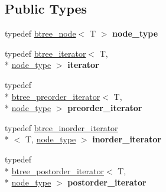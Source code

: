 \subsection*{Public Types}
\begin{DoxyCompactItemize}
\item 
\hypertarget{classtree_1_1cBinaryRep_a4218118406b4b792f771f2cffab1fe67}{typedef \hyperlink{structtree_1_1btree__node}{btree\-\_\-node}$<$ T $>$ {\bfseries node\-\_\-type}}\label{classtree_1_1cBinaryRep_a4218118406b4b792f771f2cffab1fe67}

\item 
\hypertarget{classtree_1_1cBinaryRep_af8646ca9dd6c8e2abc30f0a24eea2785}{typedef \hyperlink{classtree_1_1btree__iterator}{btree\-\_\-iterator}$<$ T, \\*
\hyperlink{structtree_1_1btree__node}{node\-\_\-type} $>$ {\bfseries iterator}}\label{classtree_1_1cBinaryRep_af8646ca9dd6c8e2abc30f0a24eea2785}

\item 
\hypertarget{classtree_1_1cBinaryRep_a80d54fe0461119770e3be144672dcbc6}{typedef \\*
\hyperlink{classtree_1_1btree__preorder__iterator}{btree\-\_\-preorder\-\_\-iterator}$<$ T, \\*
\hyperlink{structtree_1_1btree__node}{node\-\_\-type} $>$ {\bfseries preorder\-\_\-iterator}}\label{classtree_1_1cBinaryRep_a80d54fe0461119770e3be144672dcbc6}

\item 
\hypertarget{classtree_1_1cBinaryRep_ad1bba7a7672ee7bdf7ef4979a1b00879}{typedef \hyperlink{classtree_1_1btree__inorder__iterator}{btree\-\_\-inorder\-\_\-iterator}\\*
$<$ T, \hyperlink{structtree_1_1btree__node}{node\-\_\-type} $>$ {\bfseries inorder\-\_\-iterator}}\label{classtree_1_1cBinaryRep_ad1bba7a7672ee7bdf7ef4979a1b00879}

\item 
\hypertarget{classtree_1_1cBinaryRep_a7bef52fb6be8078a9d082c22f9054dd0}{typedef \\*
\hyperlink{classtree_1_1btree__postorder__iterator}{btree\-\_\-postorder\-\_\-iterator}$<$ T, \\*
\hyperlink{structtree_1_1btree__node}{node\-\_\-type} $>$ {\bfseries postorder\-\_\-iterator}}\label{classtree_1_1cBinaryRep_a7bef52fb6be8078a9d082c22f9054dd0}

\end{DoxyCompactItemize}
